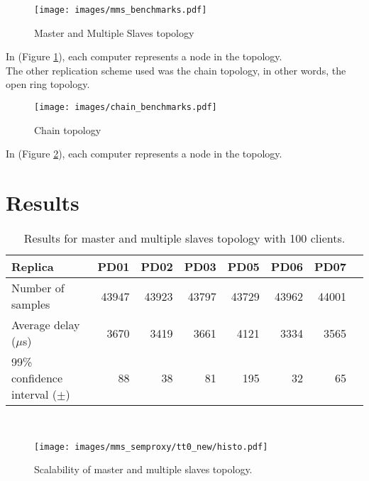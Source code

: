 \begin{figure}[h!]
\centering    
\texttt{[image: images/mms\_benchmarks.pdf]}
\caption{Master and Multiple Slaves topology}
\label{fig:multi_all}
\end{figure}

In (Figure \ref{fig:multi_all}), each computer represents a node in the topology. \\

The other replication scheme used was the chain topology, in other words, the open ring topology. 



\begin{figure}[h!]
\centering    
\texttt{[image: images/chain\_benchmarks.pdf]}
\caption{Chain topology}
\label{fig:ring_all}
\end{figure}

In (Figure \ref{fig:ring_all}), each computer represents a node in the topology. \\

\clearpage

\section{Results}

\begin{table}[t]
\centering    
\begin{tabular}{lrrrrrrr}
 \hline\hline
 Replica & PD01 & PD02 & PD03 & PD05 & PD06 & PD07 \\
\hline
Number of samples & 43947 & 43923 & 43797 & 43729 & 43962 & 44001 \\
Average delay ($\mu$s) & 3670 & 3419 & 3661 & 4121 & 3334 & 3565 \\
99\% confidence interval ($\pm$) & 88 & 38 & 81 & 195 & 32 & 65 \\
\hline
\end{tabular}

~\\
\caption{Results for master and multiple slaves topology with 100 clients.}
\label{tab:table1_delay}
\end{table}

\begin{figure}[t]
\centering    
\texttt{[image: images/mms\_semproxy/tt0\_new/histo.pdf]}
\caption{Scalability of master and multiple slaves topology.}
\label{fig:graph1}
\end{figure}

